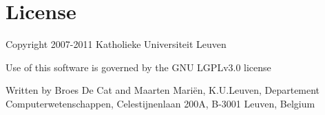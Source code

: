 \documentclass{article}
\begin{document}
\section{License}
Copyright 2007-2011 Katholieke Universiteit Leuven

Use of this software is governed by the GNU LGPLv3.0 license

Written by Broes De Cat and Maarten Mariën, K.U.Leuven, Departement Computerwetenschappen, Celestijnenlaan 200A, B-3001 Leuven, Belgium
\end{document}
